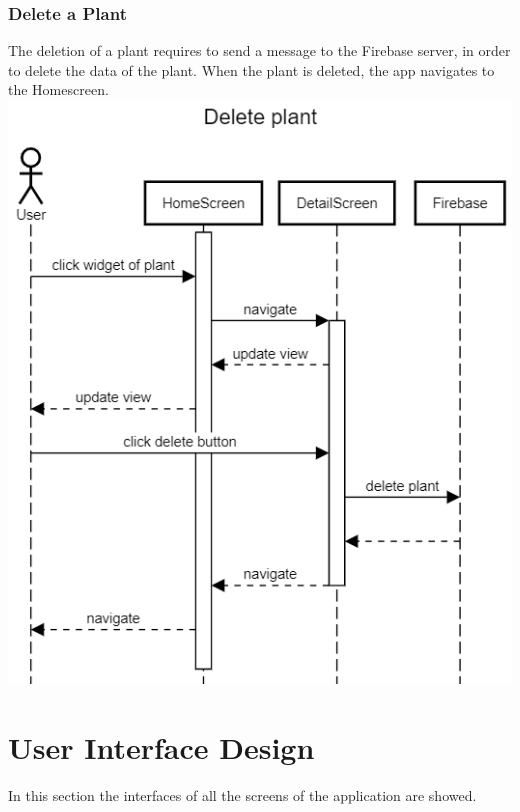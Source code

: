 \documentclass[10pt]{article}
\begin{document}
	\subsubsection{Delete a Plant}
	The deletion of a plant requires to send a message to the Firebase server, in order to delete the data of the plant. When the plant is deleted, the app navigates to the Homescreen.
	\newline
	\newline
	\newline
	\includegraphics[scale=0.40]{resources/DeletePlant.png}
	
	\newpage
	
	\section{User Interface Design}
	In this section the interfaces of all the screens of the application are showed.
	\newline
    
\end{document}

